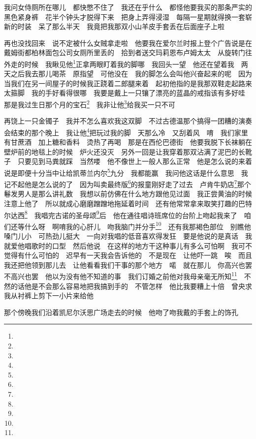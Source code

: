 \par 我问女侍厕所在哪儿　都快憋不住了　我还在乎什么　都怪他要我买的那条严实的黑色紧身裤　花半个钟头才脱得下来　把身上弄得浸湿　每隔一星期就得换一套崭新的时装　呆了那么半天　我竟把我那双小山羊皮手套丢在后面座子上啦　
\par 再也没找回来　说不定被什么女贼拿走啦　他要我在爱尔兰时报上登个广告说是在戴姆街都柏林面包公司女厕所里丢的　拾到者送交玛莉恩布卢姆太太　从旋转门往外走的时候　我瞅见他\footnote{}正拿两眼盯着我的脚哪　我回头一望　他还在望着我　两天之后我去那儿喝茶　原指望　可他没在　我的脚怎么会叫他兴奋起来的呢　因为当我们在另一间屋子的时候我正跷着二郎腿来着　起初他指的是我那双鞋走起路来太箍脚　我的手好看得很哪　我要是戴上一只镶了漂亮的蓝晶的戒指该有多好哇　那是我过生日那个月的宝石\footnote{}　我非让他\footnote{}给我买一只不可　
\par 再饶上一只金镯子　我并不怎么喜欢我这双脚　不过古德温那个搞得一团糟的演奏会结束的那个晚上　我让他\footnote{}把玩过我的脚　天那么冷　又刮着风　唷　我们家里有甘蔗酒　加上糖和香料　烫热了再喝　那是在西伦巴德街　他要我脱下长袜躺在壁炉前的地毯上的时候　炉火还没灭　另外一回是让我穿着那双沾满了泥巴的长靴子　只要见到马粪就踩　当然喽　他不像世上一般人那么正常　他是怎么说的来着　说是即便十分当中让给凯蒂兰内尔\footnote{}九分　我都能赢　我问他这话是什么意思　我记不起他是怎么说的了　因为叫卖最终版\footnote{}的报童刚好走了过去　卢肯牛奶店\footnote{}那个鬈发男人是那么讲礼数　我想以前仿佛在什么地方跟他见过面　我正尝黄油的时候注意上他了　所以就成心磨磨蹭蹭地拖延着时间　还有他常常拿来取笑打趣的巴特尔达西\footnote{}　我唱完古诺的圣母颂\footnote{}后　他在通往唱诗班席位的台阶上吻起我来了　咱们还等什么呀　啊唷我的心肝儿　吻我脑门并分手\footnote{}　还有我那褐色部位　别瞧他嗓门儿小　可热劲儿挺大　一向对我唱的低音喜欢得发狂　要是他说的是真话　我就爱他唱歌时的口型　然后他说　在这样的地方干这种事儿有多么可怕啊　我可不觉得有什么可怕的　迟早有一天我会告诉他的　不是现在　让他吓一跳　唉　而且我还把他领到那儿去　让他看看我们干事的那个地方　喏　就在那儿　你高兴也罢不高兴也罢　他以为没有他不知道的事　我们订婚之前他对我母亲毫无所知\footnote{}　不然的话他是不会那么容易地把我搞到手的　不管怎样　他比我要糟上十倍　曾央求我从衬裤上剪下一小片来给他　
\par 那个傍晚我们沿着凯尼尔沃思广场走去的时候　他吻了吻我戴的手套上的饰孔　
